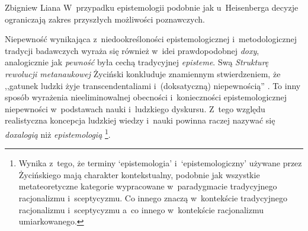 \begin{artplenv}{Zbigniew Liana}
W~przypadku epistemologii podobnie jak u~Heisenberga decyzje ograniczają zakres przyszłych możliwości poznawczych.

Niepewność wynikająca z~niedookreśloności epistemologicznej i~metodologicznej tradycji badawczych wyraża się również w~idei prawdopodobnej \textit{doxy}, analogicznie jak \textit{pewność} była cechą tradycyjnej \textit{episteme}. Swą \textit{Strukturę rewolucji metanaukowej} Życiński konkluduje znamiennym stwierdzeniem, że ,,gatunek ludzki żyje transcendentaliami i~(doksatyczną) niepewnością''
\parencites[][s.~204]{zycinski_structure_1988}[][s.~354]{zycinski_struktura_2013_liana}. %
 To inny sposób wyrażenia nieeliminowalnej obecności i~konieczności epistemologicznej niepewności w~podstawach nauki i~ludzkiego dyskursu. Z~tego względu realistyczna koncepcja ludzkiej wiedzy i~nauki powinna raczej nazywać się \textit{doxalogią} niż \textit{epistemologią} 
\parencites[][s.~227]{zycinski_teizm_1985}[][s.~305]{zycinski_structure_1988}[][s.~305]{zycinski_struktura_2013_liana}[][s.~129]{zycinski_elementy_1996}[][s.~174]{zycinski_elementy_2015}%
\footnote{Wynika z~tego, że terminy ‘epistemologia' i~‘epistemologiczny' używane przez Życińskiego mają charakter kontekstualny, podobnie jak wszystkie metateoretyczne kategorie wypracowane w~paradygmacie tradycyjnego racjonalizmu i~sceptycyzmu. Co innego znaczą w~kontekście tradycyjnego racjonalizmu i~sceptycyzmu a~co innego w~kontekście racjonalizmu umiarkowanego.}.


\end{artplenv}
